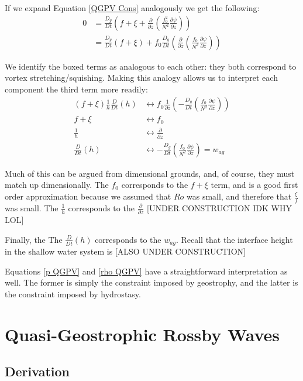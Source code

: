 If we expand Equation \ref{QGPV Cons} analogously we get the following:
\begin{align*}
    0 &= \frac{D_g}{Dt}\left( f+\xi +  \frac{\partial }{\partial z}\left( \frac{f_0^2}{N^2} \frac{\partial \psi}{\partial z} \right)\right)
    \\
    &=\frac{D_g}{Dt}(f+\xi) + \boxed{f_0 \frac{D_g}{Dt}\left( \frac{\partial }{\partial z}\left( \frac{f_0}{N^2} \frac{\partial \psi}{\partial z} \right)\right)}
\end{align*}

We identify the boxed terms as analogous to each other: they both correspond to vortex stretching/squishing. Making this analogy allows us to interpret each component the third term more readily:
\begin{align*}
    (f+\xi)\frac{1}{h}\frac{D}{Dt}(h) & \longleftrightarrow
    f_0\frac{1}{\partial z}\left( -\frac{D_g}{Dt}\left( \frac{f_0}{N^2} \frac{\partial \psi}{\partial z}\right) \right)
    \\
    f+\xi & \longleftrightarrow f_0
    \\
    \frac{1}{h} & \longleftrightarrow \frac{\partial}{\partial z}
    \\
    \frac{D}{Dt}(h) & \longleftrightarrow -\frac{D_g}{Dt}\left( \frac{f_0}{N^2} \frac{\partial \psi}{\partial z}\right)=w_{ag}
\end{align*}

Much of this can be argued from dimensional grounds, and, of course, they must match up dimensionally. The \(f_0\) corresponds to the \(f+\xi\) term, and is a good first order approximation because we assumed that \(Ro\) was small, and therefore that \(\frac{\xi}{f}\) was small. The \(\frac{1}{h}\) corresponds to the \(\frac{\partial}{\partial z}\) [UNDER CONSTRUCTION IDK WHY LOL]

Finally, the The \(\frac{D}{Dt}(h)\) corresponds to the \(w_{ag}\). Recall that the interface height in the shallow water system is [ALSO UNDER CONSTRUCTION]

Equations \ref{p QGPV} and \ref{rho QGPV} have a straightforward interpretation as well. The former is simply the constraint imposed by geostrophy, and the latter is the constraint imposed by hydrostasy.


\section{Quasi-Geostrophic Rossby Waves}

\subsection{Derivation}


